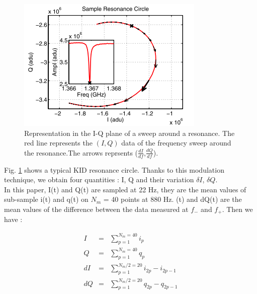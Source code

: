 \begin{figure}[h]
\center
	\includegraphics[scale=0.5]{resonance-circle.png}
	\caption{Representation in the I-Q plane of a sweep around a resonance. The red line represents the $(I,Q)$ data of the frequency sweep around the resonance.The arrows reprsents ($\frac{dI}{df}$,$\frac{dQ}{df}$). \citep{2013A&A...551L..12C}}
	\label{circle-iq}
\end{figure}

Fig. \ref{circle-iq} shows a typical KID resonance circle. Thanks to this
modulation technique, we obtain four quantities : I, Q and their variation
$\delta I$, $\delta Q$.\\ In this paper, I(t) and Q(t) are sampled at 22 Hz,
they are the mean values of sub-sample i(t) and q(t) on $N_{m}$ = 40 points at
880 Hz. \di(t) and dQ(t) are the mean values of the difference between the data
measured at $f_{-}$ and $f_{+}$. Then we have :


\begin{eqnarray}
I  &=& \sum^{N_{m}=40}_{p=1} i_{p}\\
Q  &=& \sum^{N_{m}=40}_{p=1} q_{p}\\
dI &=& \sum^{N_{m}/2=20}_{p=1} i_{2p} - i_{2p-1}\\
dQ &=& \sum^{N_{m}/2=20}_{p=1} q_{2p} - q_{2p-1}
\end{eqnarray}

